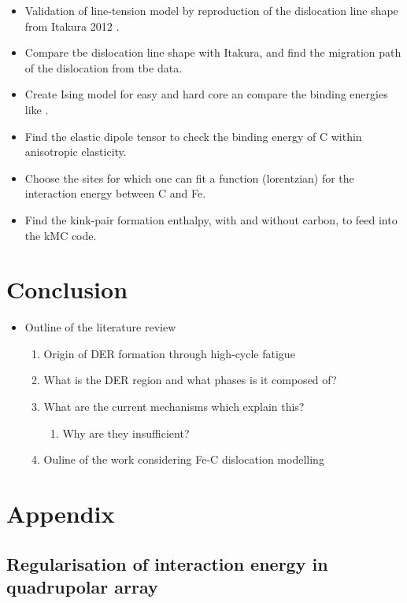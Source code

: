 \documentclass[a4paper,11pt]{article}
\begin{document}
\begin{itemize}
\item Validation of line-tension model by reproduction of the dislocation line shape from
Itakura 2012 \cite{Itakura2012}.
\item Compare tbe dislocation line shape with Itakura, and find the migration path of the dislocation from tbe data.
\item\relax [Optional] Create Ising model for easy and hard core an compare the binding energies like \cite{Lthi2019}.
\item\relax [Optional] Find the elastic dipole tensor to check the binding energy of C within anisotropic elasticity.
\item Choose the sites for which one can fit a function (lorentzian) for the interaction energy between C and Fe.
\item Find the kink-pair formation enthalpy, with and without carbon, to feed into the kMC
code.
\end{itemize}



\section{Conclusion}
\label{sec:orgd190366}


\begin{itemize}
\item Outline of the literature review 
\begin{enumerate}
\item Origin of DER formation through high-cycle fatigue
\item What is the DER region and what phases is it composed of?
\item What are the current mechanisms which explain this?
\begin{enumerate}
\item Why are they insufficient?
\end{enumerate}
\item Ouline of the work considering Fe-C dislocation modelling
\end{enumerate}
\end{itemize}

\section{Appendix}
\label{sec:org5090c6b}

\subsection{Regularisation of interaction energy in quadrupolar array}
\label{sec:orgef2b0e6}
\label{sec:Ainteractionenergy}
\end{document}
